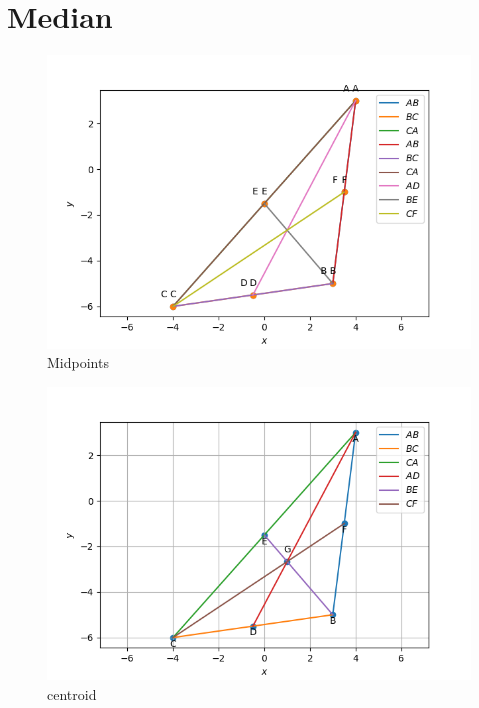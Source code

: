 \documentclass[book,11pt]{IEEEtran}
\begin{document}
\section{Median}

\begin{figure}[H]
\includegraphics[width=\columnwidth]{figs/main3.png}
\caption{Midpoints}
\label{fig:i_triangle_py}
\end{figure}
\begin{figure}[H]
\includegraphics[width=\columnwidth]{figs/main16.png}
\caption{centroid}
\label{fig:i_triangle_py}
\end{figure}
\end{document}
